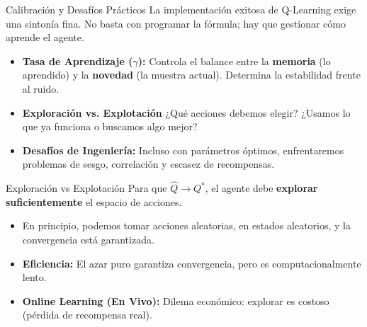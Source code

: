 \documentclass[xcolor=dvipsnames, handout]{beamer}
\begin{document}
\begin{frame}{Calibraci\'on y Desaf\'ios Pr\'acticos}
La implementaci\'on exitosa de Q-Learning exige una sinton\'ia fina. No basta con programar la f\'ormula; hay que gestionar c\'omo aprende el agente.

\begin{itemize}
    \item \textbf{Tasa de Aprendizaje ($\gamma$):} 
    Controla el balance entre la \textbf{memoria} (lo aprendido) y la \textbf{novedad} (la muestra actual). Determina la estabilidad frente al ruido.
    
    \item \textbf{Exploraci\'on vs. Explotaci\'on}
    ¿Qu\'e acciones debemos elegir? ¿Usamos lo que ya funciona o buscamos algo mejor?
    
    \item \textbf{Desaf\'ios de Ingenier\'ia:} 
    Incluso con par\'ametros óptimos, enfrentaremos problemas de sesgo, correlaci\'on y escasez de recompensas.
\end{itemize}

\end{frame}
\begin{frame}{Exploraci\'on vs Explotaci\'on}
Para que $\hat Q \to Q^*$, el agente debe \textbf{explorar suficientemente} el espacio de acciones. 

\begin{itemize}

\item En principio, podemos tomar acciones aleatorias, en estados aleatorios, y la convergencia est\'a garantizada.

    \item<2-> \textbf{Eficiencia:} El azar puro garantiza convergencia, pero es computacionalmente lento.
    
    \item<3-> \textbf{Online Learning (En Vivo):}
    Dilema econ\'omico: explorar es costoso (p\'erdida de recompensa real).

\end{itemize}

\end{frame}
\end{document}

